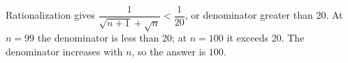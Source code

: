 Rationalization gives $\dfrac{1}{\sqrt{n+1}+\sqrt n}<\dfrac{1}{20}$, or denominator greater than 20. At $n=99$ the denominator is less than 20; at $n=100$ it exceeds 20. The denominator increases with $n$, so the answer is $\boxed{100}$.

